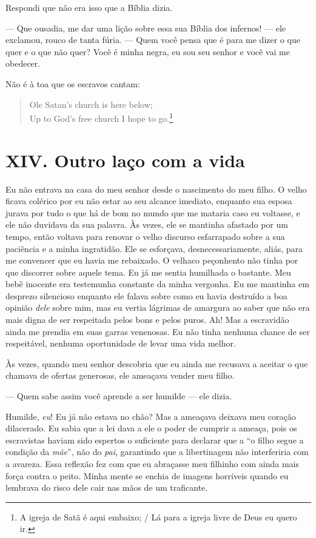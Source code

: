 Respondi que não era isso que a Bíblia
dizia.

--- Que ousadia, me dar uma lição sobre
essa sua Bíblia dos infernos! --- ele exclamou, rouco de tanta fúria.
--- Quem você pensa que é para me dizer o que quer e o que não quer?
Você é minha negra, eu sou seu senhor e você vai me obedecer.

Não é à toa que os escravos cantam:

\begin{verse}
Ole Satan's church is here below;\\
Up to God's free church I hope to go.\footnote{A igreja de Satã
é aqui embaixo; / Lá para a igreja livre de Deus eu quero ir.}
\end{verse}

\chapter{XIV. Outro laço com a
vida}

Eu não entrava na casa do meu senhor
desde o nascimento do meu filho. O velho ficava colérico por eu não
estar ao seu alcance imediato, enquanto sua esposa jurava por tudo o que
há de bom no mundo que me mataria caso eu voltasse, e ele não duvidava
da sua palavra. Às vezes, ele se mantinha afastado por um tempo, então
voltava para renovar o velho discurso esfarrapado sobre a sua paciência
e a minha ingratidão. Ele se esforçava, desnecessariamente, aliás, para
me convencer que eu havia me rebaixado. O velhaco peçonhento não tinha
por que discorrer sobre aquele tema. Eu já me sentia humilhada o
bastante. Meu bebê inocente era testemunha constante da minha vergonha.
Eu me mantinha em desprezo silencioso enquanto ele falava sobre como eu
havia destruído a boa opinião \emph{dele} sobre mim, mas eu vertia
lágrimas de amargura ao saber que não era mais digna de ser respeitada
pelos bons e pelos puros. Ah! Mas a escravidão ainda me prendia em suas
garras venenosas. Eu não tinha nenhuma chance de ser respeitável,
nenhuma oportunidade de levar uma vida melhor.

Às vezes, quando meu senhor descobria
que eu ainda me recusava a aceitar o que chamava de ofertas generosas,
ele ameaçava vender meu filho.

--- Quem sabe assim você aprende a ser humilde --- ele dizia.

Humilde, \emph{eu}! Eu já não estava no
chão? Mas a ameaçava deixava meu coração dilacerado. Eu sabia que a lei
dava a ele o poder de cumprir a ameaça, pois os escravistas haviam sido
espertos o suficiente para declarar que a ``o filho segue a condição da
\emph{mãe}'', não do \emph{pai}, garantindo que a libertinagem não
interferiria com a avareza. Essa reflexão fez com que eu abraçasse meu
filhinho com ainda mais força contra o peito. Minha mente se enchia de
imagens horríveis quando eu lembrava do risco dele cair nas mãos de um
traficante.

